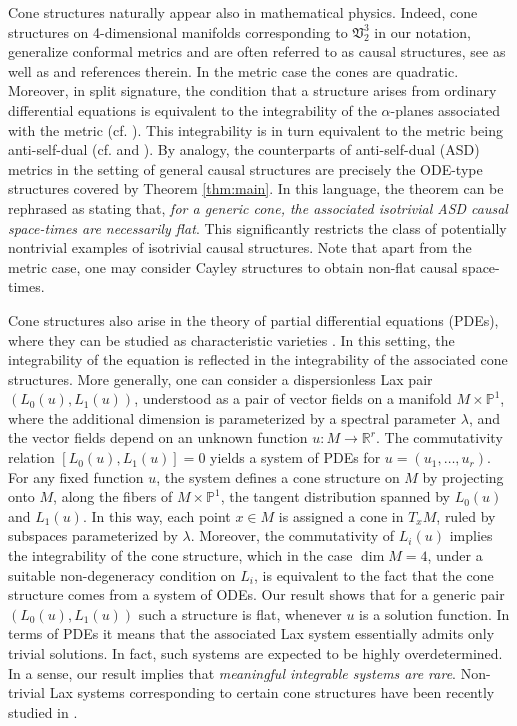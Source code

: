 \documentclass[11pt]{amsart}
\theoremstyle{definition}
\newcommand{\R}{\mathbb{R}}
\newcommand{\PP}{\mathbb{P}}
\begin{document}
Cone structures naturally appear also in mathematical physics. Indeed, cone structures on 4-dimensional manifolds corresponding to $\mathfrak{V}^3_2$ in our notation, generalize conformal metrics and are often referred to as causal structures, see \cite{HS,M} as well as \cite{KM} and references therein. In the metric case the cones are quadratic. Moreover, in split signature, the condition that a structure arises from ordinary differential equations is equivalent to the integrability of the $\alpha$-planes associated with the metric (cf. \cite{CDT,G}). This integrability is in turn equivalent to the metric being anti-self-dual (cf. \cite{P} and \cite{MW}). By analogy, the counterparts of anti-self-dual (ASD) metrics in the setting of general causal structures are precisely the ODE-type structures covered by Theorem \ref{thm:main}. In this language, the theorem can be rephrased as stating that, \emph{for a generic cone, the associated isotrivial ASD causal space-times are necessarily flat}. This significantly restricts the class of potentially nontrivial examples of isotrivial causal structures. Note that apart from the metric case, one may consider Cayley structures \cite{KM} to obtain non-flat causal space-times.

Cone structures also arise in the theory of partial differential equations (PDEs), where they can be studied as characteristic varieties \cite{FK1,KM}. In this setting, the integrability of the equation is reflected in the integrability of the associated cone structures. More generally, one can consider a dispersionless Lax pair $(L_0(u),L_1(u))$, understood as a pair of vector fields on a manifold $M\times \PP^1$, where the additional dimension is parameterized by a spectral parameter $\lambda$, and the vector fields depend on an unknown function $u\colon M\to\R^r$. The commutativity relation $[L_0(u),L_1(u)]=0$ yields a system of PDEs for $u=(u_1,\ldots,u_r)$. For any fixed function $u$, the system defines a cone structure on $M$ by projecting onto $M$, along the fibers of $M \times \PP^1$, the tangent distribution spanned by $L_0(u)$ and $L_1(u)$. In this way, each point $x \in M$ is assigned a cone in $T_xM$, ruled by subspaces parameterized by $\lambda$. Moreover, the commutativity of $L_i(u)$ implies the integrability of the cone structure, which in the case $\dim M=4$, under a suitable non-degeneracy condition on $L_i$, is equivalent to the fact that the cone structure comes from a system of ODEs. Our result shows that for a generic pair $(L_0(u),L_1(u))$ such a structure is flat, whenever $u$ is a solution function. In terms of PDEs it means that the associated Lax system essentially admits only trivial solutions.
In fact, such systems are expected to be highly overdetermined. In a sense, our result implies that \emph{meaningful integrable systems are rare}. Non-trivial Lax systems corresponding to certain cone structures have been recently studied in \cite{K3}.
 
\end{document}
